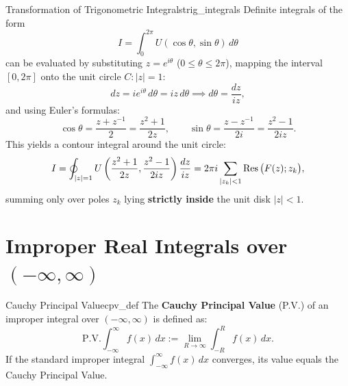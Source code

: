 \begin{proposition}{Transformation of Trigonometric Integrals}{trig_integrals}
Definite integrals of the form
\begin{equation}
I = \int_0^{2\pi} U(\cos\theta, \sin\theta)\, d\theta
\end{equation}
can be evaluated by substituting $z = e^{i\theta}$ ($0 \le \theta \le 2\pi$), mapping the interval $[0, 2\pi]$ onto the unit circle $C: |z| = 1$:
\begin{equation}
dz = i e^{i\theta}\, d\theta = i z\, d\theta \implies d\theta = \frac{dz}{iz},
\end{equation}
and using Euler's formulas:
\begin{equation}
\cos\theta = \frac{z + z^{-1}}{2} = \frac{z^2 + 1}{2z}, \qquad \sin\theta = \frac{z - z^{-1}}{2i} = \frac{z^2 - 1}{2iz}.
\end{equation}
This yields a contour integral around the unit circle:
\begin{equation}
I = \oint_{|z|=1} U\left(\frac{z^2+1}{2z}, \frac{z^2-1}{2iz}\right) \frac{dz}{iz} = 2\pi i \sum_{|z_k| < 1} \operatorname{Res}\big(F(z); z_k\big),
\end{equation}
summing only over poles $z_k$ lying \textbf{strictly inside} the unit disk $|z| < 1$.
\end{proposition}


\section{Improper Real Integrals over \texorpdfstring{$(-\infty, \infty)$}{(-infinity, infinity)}}

\begin{definition}{Cauchy Principal Value}{cpv_def}
The \textbf{Cauchy Principal Value} (P.V.) of an improper integral over $(-\infty, \infty)$ is defined as:
\begin{equation}
\text{P.V.} \int_{-\infty}^\infty f(x)\, dx := \lim_{R \to \infty} \int_{-R}^R f(x)\, dx.
\end{equation}
If the standard improper integral $\int_{-\infty}^\infty f(x)\, dx$ converges, its value equals the Cauchy Principal Value.
\end{definition}

